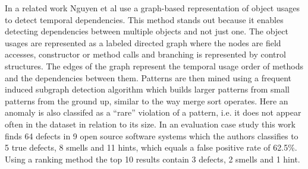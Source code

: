 In a related work Nguyen et al \cite{nguyen2009graph} use a graph-based representation of object usages to detect temporal dependencies.
This method stands out because it enables detecting dependencies between multiple objects and not just one.
The object usages are represented as a labeled directed graph where the nodes are field accesses, constructor or method calls and branching is represented by control structures.
The edges of the graph represent the temporal usage order of methods and the dependencies between them.
Patterns are then mined using a frequent induced subgraph detection algorithm which builds larger patterns from small patterns from the ground up, similar to the way merge sort operates.
Here an anomaly is also classifed as a ``rare'' violation of a pattern, i.e. it does not appear often in the dataset in relation to its size.
In an evaluation case study this work finds 64 defects in 9 open source software systems which the authors classifies to 5 true defects, 8 smells and 11 hints, which equals a false positive rate of 62.5\%.
Using a ranking method the top 10 results contain 3 defects, 2 smells and 1 hint.



